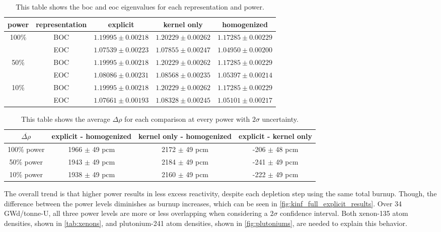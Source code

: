 \documentclass[letterpaper]{physor2024}
\begin{document}
\begin{table}[!h]
    \centering
    \caption{This table shows the \gls{boc} and \gls{eoc} eigenvalues for each representation and power.}
    \begin{tabular}{c|c|c|c|c|}
    \multicolumn{1}{l|}{power} & \multicolumn{1}{c|}{representation} & \multicolumn{1}{c|}{explicit} & \multicolumn{1}{c|}{kernel only} & \multicolumn{1}{c|}{homogenized} \\
    \hline
    \multirow{2}{*}{100\%} & BOC & $1.19995 \pm 0.00218$ & $1.20229 \pm 0.00262$ & $1.17285 \pm 0.00229 $ \\
    \cline{2-5}
     & EOC & $1.07539 \pm 0.00223$ & $1.07855 \pm 0.00247$ & $1.04950 \pm 0.00200 $ \\
    \hline
    \multirow{2}{*}{50\%} & BOC & $1.19995 \pm 0.00218$ & $1.20229 \pm 0.00262$ & $1.17285 \pm 0.00229$ \\
    \cline{2-5}
     & EOC & $1.08086 \pm 0.00231$ & $1.08568 \pm 0.00235$ & $1.05397 \pm 0.00214$ \\
     \hline
    \multirow{2}{*}{10\%} & BOC & $1.19995 \pm 0.00218$ & $1.20229 \pm 0.00262$ & $1.17285 \pm 0.00229$ \\
    \cline{2-5}
     & EOC & $1.07661 \pm 0.00193$ & $1.08328 \pm  0.00245$ & $1.05101 \pm 0.00217$ \\
    \cline{1-5}
    \end{tabular}
    \label{tab:begin_to_end}
    \vspace*{-0.3cm}
\end{table}

\begin{table}[!h]
    \caption{This table shows the average $\Delta \rho$ for each comparison at every power with $2\sigma$ uncertainty.}
    \begin{tabular}{c|c|c|c}
    $\overline{\Delta \rho}$ & explicit - homogenized & kernel only - homogenized & explicit - kernel only \\ \hline
    100\% power & 1966 $\pm$ 49 pcm & 2172 $\pm$ 49 pcm & -206 $\pm$ 48 pcm \\
    50\% power & 1943 $\pm$ 49 pcm & 2184 $\pm$ 49 pcm & -241 $\pm$ 49 pcm\\
    10\% power & 1938 $\pm$ 49 pcm & 2160 $\pm$ 49 pcm & -222 $\pm$ 49 pcm
    \end{tabular}
    \label{tab:average_pcms}
\end{table}

The overall trend is that higher power results in less excess reactivity, despite each depletion step using the same total burnup. Though, the difference between the power levels diminishes as burnup increases, which can be seen in \cref{fig:kinf_full_explicit_results}. Over 34 GWd/tonne-U, all three power levels \kinf are more or less overlapping when considering a $2\sigma$ confidence interval. Both xenon-135 atom densities, shown in \cref{tab:xenons}, and plutonium-241 atom densities, shown in \cref{fig:plutoniums}, are needed to explain this behavior.
\end{document}
